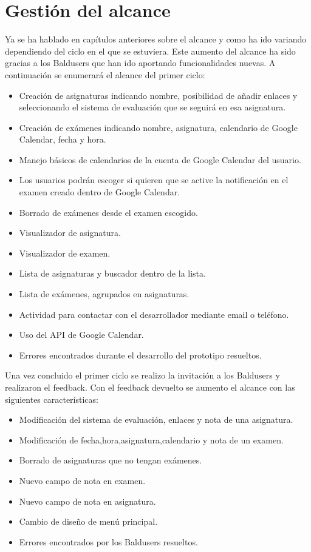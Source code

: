 \section{Gestión del alcance}
\label{secc:Gestión del alcance}

Ya se ha hablado en capítulos anteriores sobre el alcance y como ha ido variando dependiendo del ciclo en el que se estuviera. Este aumento del alcance ha sido gracias a los Baldusers que han ido aportando funcionalidades nuevas.
A continuación se enumerará el alcance del primer ciclo:
\begin{itemize}
	\item Creación de asignaturas indicando nombre, posibilidad de añadir enlaces y seleccionando el sistema de evaluación que se seguirá en esa asignatura. 
	\item Creación de exámenes indicando nombre, asignatura, calendario de Google Calendar, fecha y hora.
	\item Manejo básicos de calendarios de la cuenta de Google Calendar del usuario. 
	\item Los usuarios podrán escoger si quieren que se active la notificación en el examen creado dentro de Google Calendar.
	\item Borrado de exámenes desde el examen escogido.
	\item Visualizador de asignatura.
	\item Visualizador de examen.
	\item Lista de asignaturas y buscador dentro de la lista.
	\item Lista de exámenes, agrupados en asignaturas.
	\item Actividad para contactar con el desarrollador mediante email o teléfono.
	\item Uso del API de Google Calendar.
	\item Errores encontrados durante el desarrollo del prototipo resueltos.
\end{itemize}
\newpage
Una vez concluido el primer ciclo se realizo la invitación a los Baldusers y realizaron el feedback. Con el feedback devuelto se aumento el alcance con las siguientes características:
\begin{itemize}
	\item Modificación del sistema de evaluación, enlaces y nota de una asignatura.
	\item Modificación de fecha,hora,asignatura,calendario y nota de un examen.
	\item Borrado de asignaturas que no tengan exámenes.
	\item Nuevo campo de nota en examen.
	\item Nuevo campo de nota en asignatura.
	\item Cambio de diseño de menú principal.
	\item Errores encontrados por los Baldusers resueltos.
\end{itemize}
